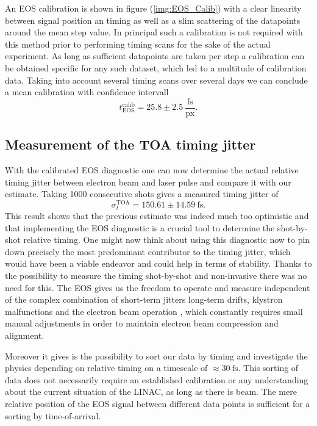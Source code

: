 An EOS calibration is shown in figure (\ref{img:EOS_Calib}) with a clear linearity between signal position an timing as well as a slim scattering of the datapoints around the mean step value.
In principal such a calibration is not required with this method prior to performing timing scans for the sake of the actual experiment. As long as sufficient datapoints are taken per step a calibration can be obtained specific for any such dataset, which led to a multitude of calibration data. Taking into account several timing scans over several days we can conclude a mean calibration with confidence intervall
\begin{equation}
t_\mathrm{EOS}^\mathrm{calib}= 25.8\pm 2.5\ \frac{\mathrm{fs}}{\mathrm{px}} .
\end{equation}




\subsection*{Measurement of the TOA timing jitter}
With the calibrated EOS diagnostic one can now determine the actual relative timing jitter between electron beam and laser pulse and compare it with our estimate. Taking 1000 consecutive shots gives a measured timing jitter of  
\begin{equation}
\sigma_t^\mathrm{TOA} = 150.61\pm14.59\ \mathrm{fs}.
\end{equation}
This result shows that the previous estimate was indeed much too optimistic and that implementing the EOS diagnostic is a crucial tool to determine the shot-by-shot relative timing. One might now think about using this diagnostic now to pin down precisely the most predominant contributor to the timing jitter, which would have been a viable endeavor and could help in terms of stability. Thanks to the possibility to measure the timing shot-by-shot and non-invasive there was no need for this. The EOS gives us the freedom to operate and measure independent of the complex combination of short-term jitters long-term drifts, klystron malfunctions and the electron beam operation , which constantly requires small manual adjustments in order to maintain electron beam compression and alignment.

Moreover it gives is the possibility to sort our data by timing and investigate the physics depending on relative timing on a timescale of $\approx 30\ \mathrm{fs}$.
This sorting of data does not necessarily require an established calibration or any understanding about the current situation of the LINAC, as long as there is beam. The mere relative position of the EOS signal between different data points is sufficient for a sorting by time-of-arrival.

